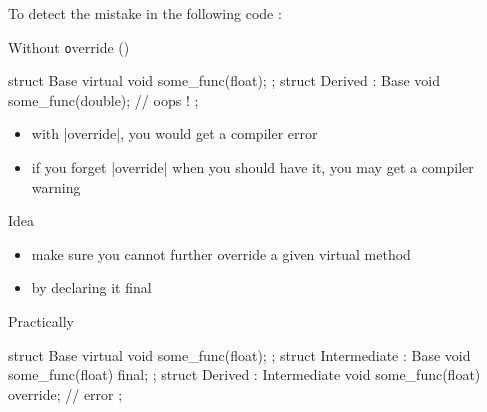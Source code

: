 \begin{frame}[fragile]
  To detect the mistake in the following code :
  \begin{block}{Without {\texttt override} ()}
    \begin{cppcode}
      struct Base {
        virtual void some_func(float);
      };
      struct Derived : Base {
        void some_func(double); // oops !
      };
    \end{cppcode}
  \end{block}
  \begin{itemize}
  \item with \cppinline|override|, you would get a compiler error
  \item if you forget \cppinline|override| when you should have it, you may get a compiler warning
  \end{itemize}
\end{frame}

\begin{advanced}
\begin{frame}[fragile]
  \begin{block}{Idea}
    \begin{itemize}
    \item make sure you cannot further override a given virtual method
    \item by declaring it final
    \end{itemize}
  \end{block}
  \begin{exampleblock}{Practically}
    \begin{cppcode}
      struct Base {
        virtual void some_func(float);
      };
      struct Intermediate : Base {
        void some_func(float) final;
      };
      struct Derived : Intermediate {
        void some_func(float) override; // error
      };
    \end{cppcode}
  \end{exampleblock}
\end{frame}
\end{advanced}

